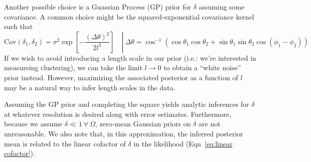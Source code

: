 \documentclass{article}
\begin{document}
Another possible choice is a Guassian Process (GP) prior for $\delta$ assuming some covariance. 
A common choice might be the squared-exponential covariance kernel such that
\begin{equation}
    \left. \text{Cov}(\delta_1, \delta_2) = \sigma^2 \exp \left[ -\frac{\left(\Delta \theta\right)^2}{2l^2}\right] \quad  \right| \ \Delta \theta = \cos^{-1}\left(\cos\theta_1\cos\theta_2 + \sin\theta_1\sin\theta_2\cos(\phi_1-\phi_2)\right)
\end{equation}
If we wish to avoid introducing a length scale in our prior (i.e.: we're interested in measureing clustering), we can take the limit $l \rightarrow 0$ to obtain a ``white noise'' prior instead.
However, maximizing the associated posterior as a function of $l$ may be a natural way to infer length scales in the data.

Assuming the GP prior and completing the square yields analytic inferences for $\delta$ at whatever resolution is desired along with error estimates.
Furthermore, because we assume $\delta \ll 1 \ \forall \ \Omega$, zero-mean Gaussian priors on $\delta$ are not unreasonable.
We also note that, in this approximation, the inferred posterior mean is related to the linear cofactor of $\delta$ in the likelihood (Eqn~\ref{eq:linear cofactor}).

\end{document}

